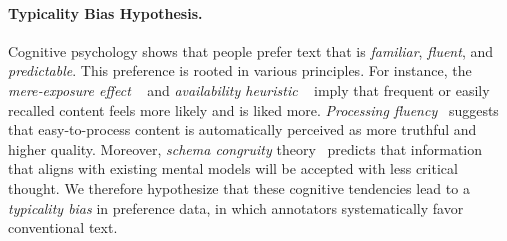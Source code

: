 

\paragraph{Typicality Bias Hypothesis.} 

Cognitive psychology shows that people prefer text that is \textit{familiar}, \textit{fluent}, and \textit{predictable}. 
This preference is rooted in various principles. For instance, the \textit{mere‑exposure effect} ~\citep{zajonc1968attitudinal,bornstein1989exposure} and \textit{availability heuristic} ~\citep{tversky1973availability}  imply that frequent or easily recalled content feels more likely and is liked more. \textit{Processing fluency}~\citep{alter2009uniting,reber2004processing} suggests that %
easy-to-process content is automatically perceived as more truthful and higher quality. Moreover,  \textit{schema congruity} theory~\citep{mandler2014structure,meyers1989schema} predicts that information that aligns with existing mental models will be accepted with less critical thought. 
We therefore hypothesize that these cognitive tendencies lead to a \textit{typicality bias} in preference data, in which annotators systematically favor conventional text.





